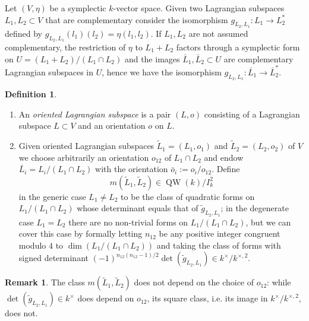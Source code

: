 \documentclass{article}
\theoremstyle{definition}
\newtheorem{rem}[thm]{Remark}
\newtheorem{dfn}[thm]{Definition}
\numberwithin{equation}{subsection}
\renewcommand{\-}{\hyp{}}
\DeclareMathOperator{\QW}{QW}
\begin{document}
\begin{appendices}
Let $(V,\eta)$ be a symplectic $k$-vector space. Given two Lagrangian subspaces $L_1,L_2 \subset V$ that are complementary consider the isomorphism $g_{L_2,L_1} : L_1 \to L_2^*$ defined by $g_{L_2,L_1}(l_1)(l_2)=\eta(l_1,l_2)$. If $L_1,L_2$ are not assumed complementary, the restriction of $\eta$ to $L_1+L_2$ factors through a symplectic form on $U=(L_1+L_2)/(L_1 \cap L_2)$ and the images $\bar L_1,\bar L_2 \subset U$ are complementary Lagrangian subspaces in $U$, hence we have the isomorphism $g_{L_2,L_1} : \bar L_1 \to \bar L_2^*$.

\begin{dfn}
	\begin{enumerate}
		\item An \emph{oriented Lagrangian subspace} is a pair $(L,o)$ consisting of a Lagrangian subspace $L \subset V$ and an orientation $o$ on $L$.
		\item Given oriented Lagrangian subspaces $\tilde L_1=(L_1,o_1)$ and $\tilde L_2=(L_2,o_2)$ of $V$ we choose arbitrarily an orientation $o_{12}$ of $L_1 \cap L_2$ and endow $\bar L_i=L_i/(L_1 \cap L_2)$ with the orientation $\bar o_i := o_i/o_{12}$. Define 
\[ m(\tilde L_1,\tilde L_2) \in \QW(k)/I_k^2 \] 
in the generic case $L_1 \neq L_2$ to be the class of quadratic forms on $L_1/(L_1 \cap L_2)$ whose determinant equals that of $\tilde g_{L_2,L_1}$; in the degenerate case $L_1=L_2$ there are no non-trivial forms on $L_1/(L_1 \cap L_2)$, but we can cover this case by formally letting $n_{12}$ be any positive integer congruent modulo $4$ to $\dim(L_1/(L_1 \cap L_2))$ and taking the class of forms with signed determinant $(-1)^{n_{12}(n_{12}-1)/2}\det(\tilde g_{L_2,L_1}) \in k^\times/k^{\times,2}$.	
	\end{enumerate}

\end{dfn}

\begin{rem}
		The class $m(\tilde L_1,\tilde L_2)$ does not depend on the choice of $o_{12}$: while $\det(\tilde g_{L_2,L_1}) \in k^\times$ does depend on $o_{12}$, its square class, i.e. its image in $k^\times/k^{\times,2}$, does not.
\end{rem}



\end{appendices}
\end{document}
